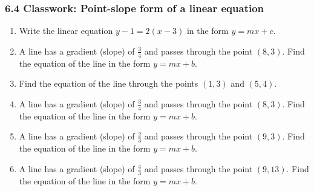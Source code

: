 

\fancyhead[LE]{\thepage}



\subsubsection*{6.4 Classwork: Point-slope form of a linear equation}
\begin{enumerate}


\subsubsection*{Point-slope form: $(y-y_1)=m(x-x_1)$}
\item Write the linear equation $y-1=2(x-3)$ in the form $y=mx+c$. \vspace{4cm}

\item A line has a gradient (slope) of $\displaystyle \frac{3}{4}$ and passes through the point $(8, 3)$. Find the equation of the line in the form $y=mx+b$.
\vspace{4cm}

\item Find the equation of the line through the points $(1, 3)$ and $(5, 4)$. 

\item A line has a gradient (slope) of $\displaystyle \frac{3}{4}$ and passes through the point $(8, 3)$. Find the equation of the line in the form $y=mx+b$.
\vspace{4cm}

\item A line has a gradient (slope) of $\displaystyle \frac{2}{3}$ and passes through the point $(9, 3)$. Find the equation of the line in the form $y=mx+b$.
    \vspace{4cm}

\item A line has a gradient (slope) of $\displaystyle \frac{4}{3}$ and passes through the point $(9, 13)$. Find the equation of the line in the form $y=mx+b$.
\vspace{3cm}


\end{enumerate}

